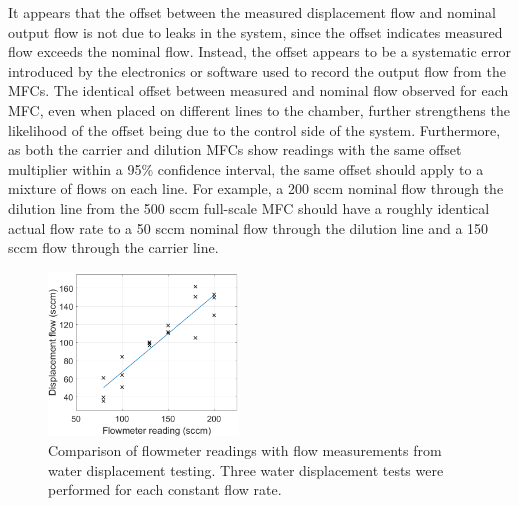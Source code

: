 \documentclass[
  a4paper,
]{scrbook}
\begin{document}
It appears that the offset between the measured displacement flow and
nominal output flow is not due to leaks in the system, since the offset
indicates measured flow exceeds the nominal flow. Instead, the offset
appears to be a systematic error introduced by the electronics or
software used to record the output flow from the MFCs. The identical
offset between measured and nominal flow observed for each MFC, even
when placed on different lines to the chamber, further strengthens the
likelihood of the offset being due to the control side of the system.
Furthermore, as both the carrier and dilution MFCs show readings with
the same offset multiplier within a 95\% confidence interval, the same
offset should apply to a mixture of flows on each line. For example, a
200 sccm nominal flow through the dilution line from the 500 sccm
full-scale MFC should have a roughly identical actual flow rate to a 50
sccm nominal flow through the dilution line and a 150 sccm flow through
the carrier line.

\begin{figure}

{\centering \includegraphics[width=0.45\textwidth,height=\textheight]{figures/ch8/PID_flowmeter.png}

}

\caption[Calibration curves showing the flowmeter readings relative to
flow measurements from water displacement
testing.]{\label{fig-flowmeter-calibration}Comparison of flowmeter
readings with flow measurements from water displacement testing. Three
water displacement tests were performed for each constant flow rate.}

\end{figure}
\end{document}
